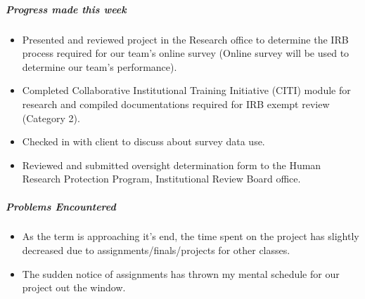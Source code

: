 {\subparagraph{Progress made this week}
\begin{itemize}
  \item Presented and reviewed project in the Research office to determine the IRB process required for our team's online survey (Online survey will be used to determine our team's performance).
  \item Completed Collaborative Institutional Training Initiative (CITI) module for research and compiled documentations required for IRB exempt review (Category 2).
  \item Checked in with client to discuss about survey data use.
  \item Reviewed and submitted oversight determination form to the Human Research Protection Program, Institutional Review Board office.
\end{itemize}

\subparagraph{Problems Encountered}
\begin{itemize}
  \item As the term is approaching it's end, the time spent on the project has slightly decreased due to assignments/finals/projects for other classes.
  \item The sudden notice of assignments has thrown my mental schedule for our project out the window.
\end{itemize}

}

\newpage

